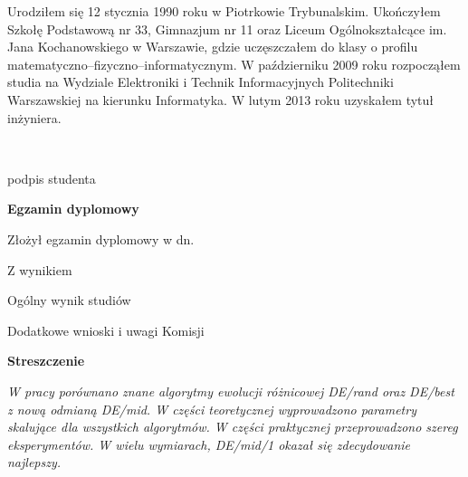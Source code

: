 \begin{titlepage}
    \indent
Urodziłem się 12 stycznia 1990 roku w Piotrkowie Trybunalskim. Ukończyłem Szkołę Podstawową
nr 33, Gimnazjum nr 11 oraz Liceum Ogólnokształcące im. Jana Kochanowskiego w Warszawie, gdzie
uczęszczałem do klasy o profilu matematyczno--fizyczno--informatycznym.
W październiku 2009 roku rozpocząłem studia na Wydziale Elektroniki i Technik Informacyjnych
Politechniki Warszawskiej na kierunku Informatyka. W lutym 2013 roku uzyskałem
tytuł inżyniera.

    \par
    \vspace{2\baselineskip}
    \hfill\parbox{15em}{{\small\dotfill}\\[-.3ex]
    \centerline{\footnotesize podpis studenta}}\par
    \vspace{3\baselineskip}
    \begin{center}
 	{\large\bfseries Egzamin dyplomowy} \par\bigskip\bigskip
    \end{center}
    \par\noindent\vspace{1.5\baselineskip}
    Złożył egzamin dyplomowy w dn. \dotfill
    \par\noindent\vspace{1.5\baselineskip}
    Z wynikiem \dotfill
    \par\noindent\vspace{1.5\baselineskip}
    Ogólny wynik studiów \dotfill
    \par\noindent\vspace{1.5\baselineskip}
    Dodatkowe wnioski i uwagi Komisji \dotfill

  
    \newpage\thispagestyle{empty}
    \vspace*{2\baselineskip}
    \begin{center}
	{\large\bfseries Streszczenie}\par\bigskip
    \end{center}

    {\itshape
W pracy porównano znane algorytmy ewolucji różnicowej DE/rand oraz DE/best z nową odmianą DE/mid.
W części teoretycznej wyprowadzono parametry skalujące dla wszystkich algorytmów. W części praktycznej
przeprowadzono szereg eksperymentów. W wielu wymiarach,
DE/mid/1 okazał się zdecydowanie najlepszy.}
    \vspace*{1\baselineskip}


\end{titlepage}
